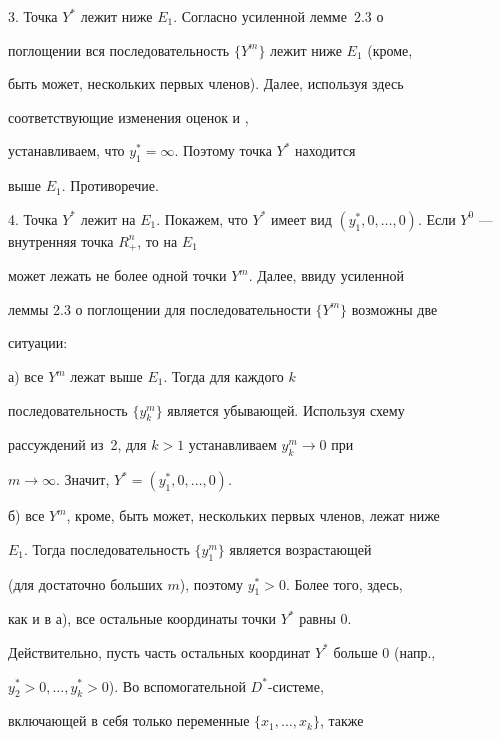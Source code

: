 \begin{pf}
3. Точка $Y^*$ лежит ниже $E_1$. Согласно усиленной лемме~2.3 о 


поглощении вся последовательность $\{Y^m\}$ лежит ниже $E_1$ (кроме, 


быть может, нескольких первых членов). Далее, используя здесь 


соответствующие изменения оценок  и , 


устанавливаем, что $y_1^*=\infty$. Поэтому точка $Y^*$ находится 


выше $E_1$. Противоречие.


\medskip





4. Точка $Y^*$ лежит на $E_1$. Покажем, что $Y^*$ имеет вид $(y_1^*,


0,\dotsc,0)$. Если $Y^0$ --- внутренняя точка $R_+^n$, то на $E_1$ 


может лежать не более одной точки $Y^m$. Далее, ввиду усиленной 


леммы 2.3 о поглощении для последовательности $\{Y^m\}$ возможны две 


ситуации:


\smallskip





а) все $Y^m$ лежат выше $E_1$. Тогда для каждого $k$ 


последовательность $\{y_k^m\}$ является убывающей. Используя схему 


рассуждений из~2, для $k>1$ устанавливаем $y_k^m\to 0$ при 


$m\to\infty$. Значит, $Y^*=(y_1^*,0,\dotsc,0)$.


\smallskip





б) все $Y^m$, кроме, быть может, нескольких первых членов, лежат ниже 


$E_1$. Тогда последовательность $\{y_1^m\}$ является возрастающей 


(для достаточно больших $m$), поэтому $y_1^*>0$. Более того, здесь, 


как и в а), все остальные координаты точки $Y^*$ равны $0$. 


Действительно, пусть часть остальных координат $Y^*$ больше $0$ (напр., 


$y_2^*>0,\dotsc,y_k^*>0$). Во вспомогательной $D^*$-системе, 


включающей в себя только переменные $\{x_1,\dotsc,x_k\}$, также 



\end{pf}
